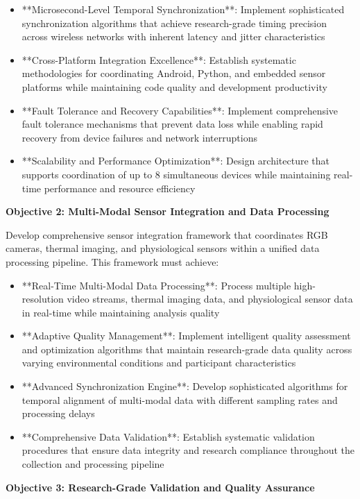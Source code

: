 \documentclass[12pt,a4paper]{report}
\begin{document}
\begin{itemize}
\item **Microsecond-Level Temporal Synchronization**: Implement sophisticated synchronization algorithms that achieve
  research-grade timing precision across wireless networks with inherent latency and jitter characteristics
\item **Cross-Platform Integration Excellence**: Establish systematic methodologies for coordinating Android, Python, and
  embedded sensor platforms while maintaining code quality and development productivity
\item **Fault Tolerance and Recovery Capabilities**: Implement comprehensive fault tolerance mechanisms that prevent data
  loss while enabling rapid recovery from device failures and network interruptions
\item **Scalability and Performance Optimization**: Design architecture that supports coordination of up to 8 simultaneous
  devices while maintaining real-time performance and resource efficiency

\end{itemize}
\textbf{Objective 2: Multi-Modal Sensor Integration and Data Processing}

Develop comprehensive sensor integration framework that coordinates RGB cameras, thermal imaging, and physiological
sensors within a unified data processing pipeline. This framework must achieve:

\begin{itemize}
\item **Real-Time Multi-Modal Data Processing**: Process multiple high-resolution video streams, thermal imaging data, and
  physiological sensor data in real-time while maintaining analysis quality
\item **Adaptive Quality Management**: Implement intelligent quality assessment and optimization algorithms that maintain
  research-grade data quality across varying environmental conditions and participant characteristics
\item **Advanced Synchronization Engine**: Develop sophisticated algorithms for temporal alignment of multi-modal data with
  different sampling rates and processing delays
\item **Comprehensive Data Validation**: Establish systematic validation procedures that ensure data integrity and research
  compliance throughout the collection and processing pipeline

\end{itemize}
\textbf{Objective 3: Research-Grade Validation and Quality Assurance}
\end{document}
